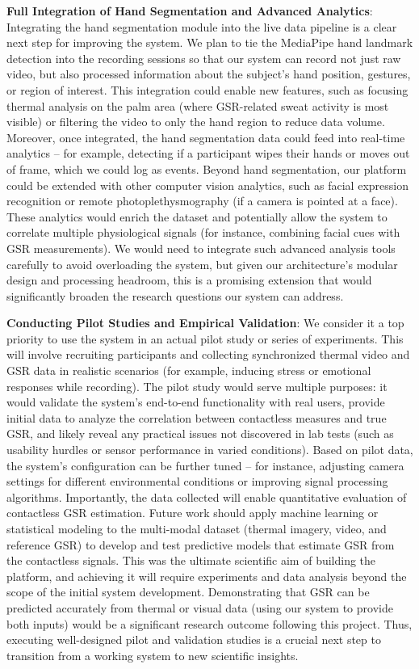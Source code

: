 \textbf{Full Integration of Hand Segmentation and Advanced Analytics}: Integrating the hand segmentation module into the live data pipeline is a clear next step for improving the system. We plan to tie the MediaPipe hand landmark detection into the recording sessions so that our system can record not just raw video, but also processed information about the subject's hand position, gestures, or region of interest. This integration could enable new features, such as focusing thermal analysis on the palm area (where GSR-related sweat activity is most visible) or filtering the video to only the hand region to reduce data volume. Moreover, once integrated, the hand segmentation data could feed into real-time analytics -- for example, detecting if a participant wipes their hands or moves out of frame, which we could log as events. Beyond hand segmentation, our platform could be extended with other computer vision analytics, such as facial expression recognition or remote photoplethysmography (if a camera is pointed at a face). These analytics would enrich the dataset and potentially allow the system to correlate multiple physiological signals (for instance, combining facial cues with GSR measurements). We would need to integrate such advanced analysis tools carefully to avoid overloading the system, but given our architecture's modular design and processing headroom, this is a promising extension that would significantly broaden the research questions our system can address.

\textbf{Conducting Pilot Studies and Empirical Validation}: We consider it a top priority to use the system in an actual pilot study or series of experiments. This will involve recruiting participants and collecting synchronized thermal video and GSR data in realistic scenarios (for example, inducing stress or emotional responses while recording). The pilot study would serve multiple purposes: it would validate the system's end-to-end functionality with real users, provide initial data to analyze the correlation between contactless measures and true GSR, and likely reveal any practical issues not discovered in lab tests (such as usability hurdles or sensor performance in varied conditions). Based on pilot data, the system's configuration can be further tuned -- for instance, adjusting camera settings for different environmental conditions or improving signal processing algorithms. Importantly, the data collected will enable quantitative evaluation of contactless GSR estimation. Future work should apply machine learning or statistical modeling to the multi-modal dataset (thermal imagery, video, and reference GSR) to develop and test predictive models that estimate GSR from the contactless signals. This was the ultimate scientific aim of building the platform, and achieving it will require experiments and data analysis beyond the scope of the initial system development. Demonstrating that GSR can be predicted accurately from thermal or visual data (using our system to provide both inputs) would be a significant research outcome following this project. Thus, executing well-designed pilot and validation studies is a crucial next step to transition from a working system to new scientific insights.

